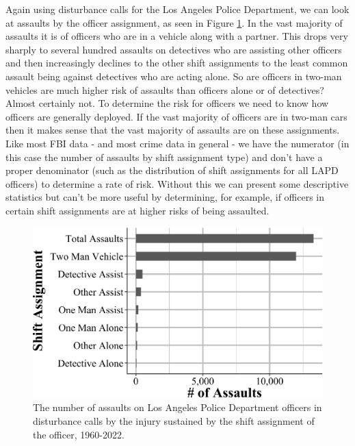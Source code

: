 \documentclass[
  12pt,
  openany]{book}
\begin{document}
Again using disturbance calls for the Los Angeles Police Department, we can look at assaults by the officer assignment, as seen in Figure \ref{fig:leokaShiftAssignment}. In the vast majority of assaults it is of officers who are in a vehicle along with a partner. This drops very sharply to several hundred assaults on detectives who are assisting other officers and then increasingly declines to the other shift assignments to the least common assault being against detectives who are acting alone. So are officers in two-man vehicles are much higher risk of assaults than officers alone or of detectives? Almost certainly not. To determine the risk for officers we need to know how officers are generally deployed. If the vast majority of officers are in two-man cars then it makes sense that the vast majority of assaults are on these assignments. Like most FBI data - and most crime data in general - we have the numerator (in this case the number of assaults by shift assignment type) and don't have a proper denominator (such as the distribution of shift assignments for all LAPD officers) to determine a rate of risk. Without this we can present some descriptive statistics but can't be more useful by determining, for example, if officers in certain shift assignments are at higher risks of being assaulted.

\begin{figure}

{\centering \includegraphics[width=0.9\linewidth]{07_leoka_files/figure-latex/leokaShiftAssignment-1} 

}

\caption{The number of assaults on Los Angeles Police Department officers in disturbance calls by the injury sustained by the shift assignment of the officer, 1960-2022.}\label{fig:leokaShiftAssignment}
\end{figure}
\end{document}
